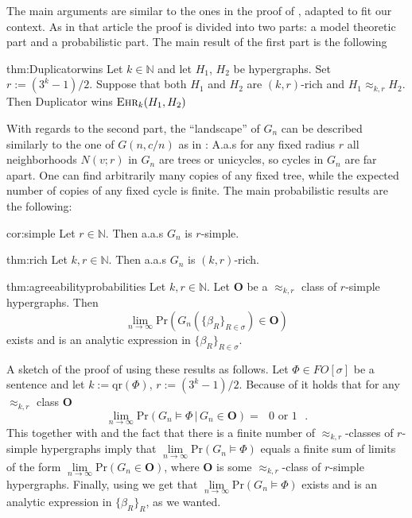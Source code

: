 \documentclass[12pt,notitlepage,a4paper]{article}
\theoremstyle{definition}
\newcommand{\N}{\mathbb{N}}
\newcommand{\Ln}{\lim\limits_{n\to \infty}}
\newcommand{\ehr}{\textsc{Ehr}}
\newcommand{\PR}[1]{\mathrm{Pr}\left(#1\right)}
\newcommand{\qr}{\mathrm{qr}}
\begin{document}
The main arguments are similar to the ones in the proof of
 \cite[Theorem 2.1]{lynch1992probabilities},
adapted to fit our context. As in that
article the proof is divided into two parts: a model theoretic part and a 
probabilistic part. The main result of the first part is the following

\begin{reptheorem}{thm:Duplicatorwins}
	Let $k\in \N$ and let $H_1$, $H_2$ be hypergraphs. Set $r:=(3^k-1)/2$. Suppose
	that both $H_1$ and $H_2$ are $(k,r)$-rich and
	$H_1\approx_{k,r} H_2$. Then Duplicator wins $\ehr_{k}(H_1,H_2)$
\end{reptheorem}

With regards to the second part, 
the ``landscape'' of $G_n$ can be described similarly to the one 
of $G(n,c/n)$ as in \cite{shelah1994can}: A.a.s for any fixed radius $r$
all neighborhoods $N(v;r)$ in $G_n$ are trees or unicycles, so cycles in 
$G_n$ are far apart. One can find arbitrarily
many copies of any fixed tree, while the expected number of copies 
of any fixed cycle is finite. The main probabilistic results are the
following:
\begin{reptheorem}{cor:simple}
  	Let $r\in \N$. Then a.a.s $G_n$ is $r$-simple.
\end{reptheorem}

\begin{reptheorem}{thm:rich}
	Let $k,r\in \N$. Then a.a.s $G_n$ is $(k,r)$-rich.
\end{reptheorem}


\begin{reptheorem}{thm:agreeabilityprobabilities}
	Let $k,r \in \N$. Let $\mathbf{O}$ be a $\approx_{k,r}$ class
	of $r$-simple hypergraphs. Then 
	\[
	\Ln \mathrm{Pr}\left(G_n\left(\{\beta_R\}_{R\in \sigma}\right)\in \mathbf{O}\right)
	\]
	exists
	and is an analytic expression in $\{\beta_R\}_{R\in \sigma}$.
\end{reptheorem}

A sketch of the proof of  using these results as follows. 
Let $\Phi\in FO[\sigma]$ be a sentence and let $k:=\qr(\Phi)$, $r:=(3^k-1)/2$.
Because of 
it holds that for any $\approx_{k,r}$ class $\mathbf{O}$
\[
\Ln \mathrm{Pr}\left(G_n \models \Phi\, \big| \, G_n\in \mathbf{O} \right)= \text{ $0$ or $1$ }.
\]
This together with 
and the fact that there is a finite number of
$\approx_{k,r}$-classes of $r$-simple hypergraphs imply that $\Ln \PR{G_n \models \Phi}$
equals a finite sum of limits of the form $\Ln \PR{G_n \in \mathbf{O}}$,
where $\mathbf{O}$ is some $\approx_{k,r}$-class of $r$-simple hypergraphs.
Finally, using 
 we get that $\Ln \PR{G_n \models \Phi}$ exists and 
is an analytic expression in $\{\beta_R\}_{R}$, as we wanted. 
\end{document}
